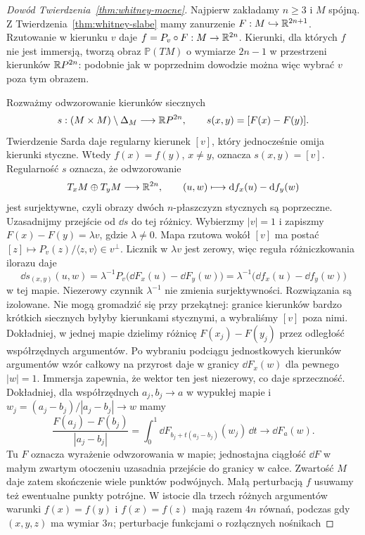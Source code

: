 \begin{proof}[Dowód Twierdzenia~\ref{thm:whitney-mocne}]
Najpierw zakładamy $n\geq3$ i $M$ spójną.
Z Twierdzenia~\ref{thm:whitney-slabe}
mamy zanurzenie $F:M\hookrightarrow\mathbb{R}^{2n+1}$.
Rzutowanie w kierunku $v$ daje
$f=P_v\circ F:M\to\mathbb{R}^{2n}$. Kierunki,
dla których $f$ nie jest immersją,
tworzą obraz $\mathbb P(TM)$ o wymiarze
$2n-1$ w przestrzeni kierunków
$\mathbb{R} P^{2n}$: podobnie jak w poprzednim
dowodzie można więc wybrać $v$ poza
tym obrazem.

Rozważmy odwzorowanie kierunków siecznych
\[
 s:(M\times M)\setminus\Delta_M
   \longrightarrow\mathbb{R} P^{2n},\qquad
 s(x,y)=[F(x)-F(y)].
\]
Twierdzenie Sarda daje regularny kierunek
$[v]$, który jednocześnie omija
kierunki styczne. Wtedy
$f(x)=f(y)$, $x\ne y$, oznacza
$s(x,y)=[v]$. Regularność $s$
oznacza, że odwzorowanie
\[
 T_xM\oplus T_yM\longrightarrow\mathbb{R}^{2n},
 \qquad (u,w)\longmapsto
   \mathrm d f_x(u)-\mathrm d f_y(w)
\]
jest surjektywne, czyli obrazy dwóch
$n$-płaszczyzn stycznych są poprzeczne.
Uzasadnijmy przejście od $\dd s$ do tej różnicy.
Wybierzmy $|v|=1$ i zapiszmy $F(x)-F(y)=\lambda v$,
gdzie $\lambda\ne0$.
Mapa rzutowa wokół $[v]$ ma postać
$[z]\mapsto P_v(z)/\langle z,v\rangle\in v^\perp$.
Licznik w $\lambda v$ jest zerowy, więc reguła
różniczkowania ilorazu daje
\[
 \dd s_{(x,y)}(u,w)
 =\lambda^{-1}P_v\bigl(\dd F_x(u)-\dd F_y(w)\bigr)
 =\lambda^{-1}\bigl(\dd f_x(u)-\dd f_y(w)\bigr)
\]
w tej mapie. Niezerowy czynnik $\lambda^{-1}$
nie zmienia surjektywności.
Rozwiązania są izolowane. Nie mogą
gromadzić się przy przekątnej:
granice kierunków bardzo krótkich
siecznych byłyby kierunkami stycznymi,
a wybraliśmy $[v]$ poza nimi. Dokładniej, w jednej
mapie dzielimy różnicę $F(x_j)-F(y_j)$ przez
odległość współrzędnych argumentów. Po wybraniu
podciągu jednostkowych kierunków argumentów wzór
całkowy na przyrost daje w granicy $\dd F_x(w)$
dla pewnego $|w|=1$. Immersja zapewnia, że wektor
ten jest niezerowy, co daje sprzeczność.
Dokładniej, dla współrzędnych $a_j,b_j\to a$ w wypukłej
mapie i $w_j=(a_j-b_j)/|a_j-b_j|\to w$ mamy
\[
 \frac{F(a_j)-F(b_j)}{|a_j-b_j|}
 =\int_0^1 \dd F_{b_j+t(a_j-b_j)}(w_j)\,\dd t
 \longrightarrow\dd F_a(w).
\]
Tu $F$ oznacza wyrażenie odwzorowania w mapie;
jednostajna ciągłość $\dd F$ w małym zwartym otoczeniu
uzasadnia przejście do granicy w całce.
Zwartość $M$ daje zatem skończenie
wiele punktów podwójnych.
Małą perturbacją $f$ usuwamy też
ewentualne punkty potrójne.
W istocie dla trzech różnych argumentów
warunki $f(x)=f(y)$ i $f(x)=f(z)$
mają razem $4n$ równań, podczas gdy
$(x,y,z)$ ma wymiar $3n$; perturbacje
funkcjami o rozłącznych nośnikach

\end{proof}
